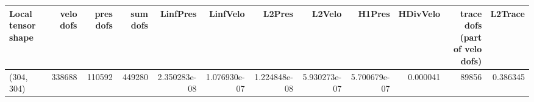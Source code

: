 \begin{tabular}{lrrrrrrrrrrr}
\toprule
Local tensor shape &  velo dofs &  pres dofs &  sum dofs &     LinfPres &     LinfVelo &       L2Pres &       L2Velo &       H1Pres &  HDivVelo &  trace dofs (part of velo dofs) &  L2Trace \\
\midrule
        (304, 304) &     338688 &     110592 &    449280 & 2.350283e-08 & 1.076930e-07 & 1.224848e-08 & 5.930273e-07 & 5.700679e-07 &  0.000041 &                           89856 & 0.386345 \\
\bottomrule
\end{tabular}
